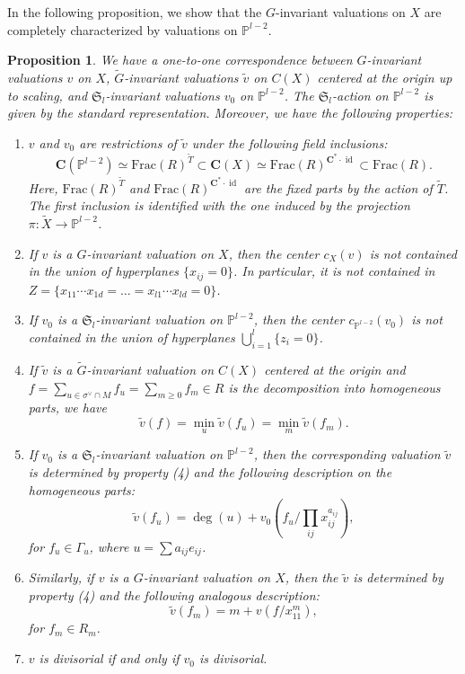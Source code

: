 \documentclass[letterpaper,11pt]{amsart}
\theoremstyle{plain}
\newtheorem{prop}[theo]{Proposition}
\theoremstyle{definition}
\theoremstyle{remark}
\newcommand{\PP}{\mathbb{P}}
\newcommand{\CC}{\mathbf{C}}
\newcommand{\sta}{^{*}}
\newcommand{\dual}{^{\vee}}
\DeclareMathOperator{\id}{id}
\begin{document}
    In the following proposition, we show that the $G$-invariant valuations on $X$ are completely characterized by valuations on $\PP^{l-2}$.
    \begin{prop}\label{prop:valuations-on-X}
        We have a one-to-one correspondence between $G$-invariant valuations $v$ on $X$, $\widetilde{G}$-invariant valuations $\widetilde{v}$ on $C(X)$ centered at the origin up to scaling, and $\mathfrak{S}_{l}$-invariant valuations $v_{0}$ on $\PP^{l-2}$. The $\mathfrak{S}_{l}$-action on $\PP^{l-2}$ is given by the standard representation. Moreover, we have the following properties:
        \begin{enumerate}
            \item $v$ and $v_{0}$ are restrictions of $\widetilde{v}$ under the following field inclusions:
            $$ \CC(\PP^{l-2}) \simeq \mathrm{Frac}(R)^{\widetilde{T}} \subset \CC(X) \simeq \mathrm{Frac}(R)^{\CC\sta \cdot \id} \subset \mathrm{Frac}(R). $$
            Here, $\mathrm{Frac}(R)^{\widetilde{T}}$ and $\mathrm{Frac}(R)^{\CC\sta \cdot \id}$ are the fixed parts by the action of $\widetilde{T}$. The first inclusion is identified with the one induced by the projection $\pi\colon \widetilde{X} \to \PP^{l-2}$.
            \item If $v$ is a $G$-invariant valuation on $X$, then the center $c_{X}(v)$ is not contained in the union of hyperplanes $\{x_{ij} =0\}$. In particular, it is not contained in $Z = \{ x_{11}\cdots x_{1d} = \ldots = x_{l1}\cdots x_{ld} = 0\}$.
            \item If $v_{0}$ is a $\mathfrak{S}_{l}$-invariant valuation on $\PP^{l-2}$, then the center $c_{\PP^{l-2}}(v_{0})$ is not contained in the union of hyperplanes $\bigcup_{i=1}^{l} \{ z_{i} = 0\}$.
            \item If $\widetilde{v}$ is a $\widetilde{G}$-invariant valuation on $C(X)$ centered at the origin and $f = \sum_{u \in \sigma\dual \cap M} f_{u} = \sum_{m \geq 0} f_{m} \in R$ is the decomposition into homogeneous parts, we have
            $$ \widetilde{v}(f) = \min_{u} \widetilde{v}(f_{u}) = \min_{m} \widetilde{v}(f_{m}).$$
            \item If $v_{0}$ is a $\mathfrak{S}_{l}$-invariant valuation on $\PP^{l-2}$, then the corresponding valuation $\widetilde{v}$ is determined by property (4) and the following description on the homogeneous parts:
            $$ \widetilde{v}(f_{u}) = \deg(u) + v_{0}(f_{u}/ \prod_{ij} x_{ij}^{a_{ij}}),$$
            for $f_{u} \in \Gamma_{u}$, where $u = \sum a_{ij} e_{ij}$.
            \item Similarly, if $v$ is a $G$-invariant valuation on $X$, then the $\widetilde{v}$ is determined by property (4) and the following analogous description:
            $$ \widetilde{v}(f_{m}) = m + v(f/x_{11}^{m}),$$
            for $f_{m} \in R_{m}$.
            \item $v$ is divisorial if and only if $v_{0}$ is divisorial.
        \end{enumerate}
    \end{prop}
\end{document}
